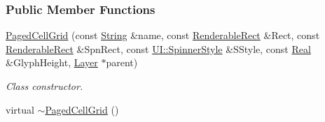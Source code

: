 \subsubsection*{Public Member Functions}
\begin{DoxyCompactItemize}
\item 
\hyperlink{classMezzanine_1_1UI_1_1PagedCellGrid_ac30a2ae0f11685a54682c5ee00a0c36e}{PagedCellGrid} (const \hyperlink{namespaceMezzanine_acf9fcc130e6ebf08e3d8491aebcf1c86}{String} \&name, const \hyperlink{structMezzanine_1_1UI_1_1RenderableRect}{RenderableRect} \&Rect, const \hyperlink{structMezzanine_1_1UI_1_1RenderableRect}{RenderableRect} \&SpnRect, const \hyperlink{namespaceMezzanine_1_1UI_a62462d4df783dcdda77e1590a96bc6d6}{UI::SpinnerStyle} \&SStyle, const \hyperlink{namespaceMezzanine_a726731b1a7df72bf3583e4a97282c6f6}{Real} \&GlyphHeight, \hyperlink{classMezzanine_1_1UI_1_1Layer}{Layer} $\ast$parent)
\begin{DoxyCompactList}\small\item\em Class constructor. \item\end{DoxyCompactList}\item 
\hypertarget{classMezzanine_1_1UI_1_1PagedCellGrid_a2ca41cf2126edae60b2528c50befa2dd}{
virtual \hyperlink{classMezzanine_1_1UI_1_1PagedCellGrid_a2ca41cf2126edae60b2528c50befa2dd}{$\sim$PagedCellGrid} ()}
\label{classMezzanine_1_1UI_1_1PagedCellGrid_a2ca41cf2126edae60b2528c50befa2dd}


\end{DoxyCompactItemize}
